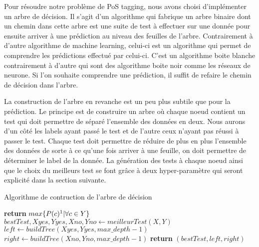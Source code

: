 \documentclass[french, 14pt]{memoir}
\begin{document}
Pour résoudre notre problème de PoS tagging, nous avons choisi d'implémenter un arbre de décision. Il s'agit d'un algorithme qui fabrique un arbre binaire dont un chemin dans cette arbre est une suite de test à effectuer sur une donnée pour ensuite arriver à une prédiction au niveau des feuilles de l'arbre. Contrairement à d'autre algorithme de machine learning, celui-ci est un algorithme qui permet de comprendre les prédictions effectué par celui-ci. C'est un algorithme boite blanche contrairement à d'autre qui sont des algorithme boite noir comme les réseaux de neurone. 
Si l'on souhaite comprendre une prédiction, il suffit de refaire le chemin de décision dans l'arbre. 

La construction de l'arbre en revanche est un peu plus subtile que pour la prédiction. Le principe est de construire un arbre où chaque noeud contient un test qui doit permettre de séparé l'ensemble des données en deux. Nous aurons d'un côté les labels ayant passé le test et de l'autre ceux n'ayant pas réussi à passer le test. Chaque test doit permettre de réduire de plus en plus l'ensemble des données de sorte à ce qu'une fois arriver à une feuille, on doit permettre de déterminer le label de la donnée. La génération des tests à chaque noeud ainsi que le choix du meilleurs test se font grâce à deux hyper-paramètre qui seront explicité dans la section suivante. 

\begin{algorithm}
\begin{minipage}[t]{20cm}
\caption{Algorithme de contruction de l'arbre de décision}
\label{buildTree}
\begin{algorithmic}[1]
\State \textbf{return} $max\{P(c)\footnote{où P(c) est la probabilité d'apparition de la classe c dans Y}|\forall c \in Y\}$
\Else
\State $bestTest, Xyes, Yyes, Xno, Yno \gets meilleurTest(X, Y)$
\State $left \gets buildTree(Xyes, Yyes, max\_depth - 1)$
\State $right \gets buildTree(Xno, Yno, max\_depth - 1)$
\State \textbf{return} $(bestTest, left, right)$
\EndIf
\EndFunction
\end{algorithmic}
\end{minipage}
\end{algorithm}
\end{document}
